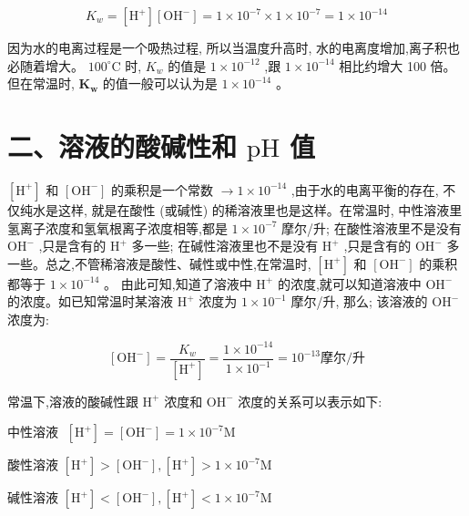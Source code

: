 \documentclass[10pt]{article}
\begin{document}
\[
{K}_{w} = \left\lbrack {\mathrm{H}}^{ + }\right\rbrack \left\lbrack {\mathrm{{OH}}}^{ - }\right\rbrack = 1 \times {10}^{-7} \times 1 \times {10}^{-7} = 1 \times {10}^{-{14}}
\]

因为水的电离过程是一个吸热过程, 所以当温度升高时, 水的电离度增加,离子积也必随着增大。 \({100}^{ \circ }\mathrm{C}\) 时, \({K}_{w}\) 的值是 \(1 \times {10}^{-{12}}\) ,跟 \(1 \times {10}^{-{14}}\) 相比约增大 100 倍。但在常温时, \({\mathbf{K}}_{\mathbf{w}}\) 的值一般可以认为是 \(1 \times {10}^{-{14}}\) 。

\section*{二、溶液的酸碱性和 \(\mathrm{{pH}}\) 值}

\(\left\lbrack {\mathrm{H}}^{ + }\right\rbrack\) 和 \(\left\lbrack {\mathrm{{OH}}}^{ - }\right\rbrack\) 的乘积是一个常数 \(\rightarrow 1 \times {10}^{-{14}}\) ,由于水的电离平衡的存在, 不仅纯水是这样, 就是在酸性 (或碱性) 的稀溶液里也是这样。在常温时, 中性溶液里氢离子浓度和氢氧根离子浓度相等,都是 \(1 \times {10}^{-7}\) 摩尔/升; 在酸性溶液里不是没有 \({\mathrm{{OH}}}^{ - }\) ,只是含有的 \({\mathrm{H}}^{ + }\) 多一些; 在碱性溶液里也不是没有 \({\mathrm{H}}^{ + }\) ,只是含有的 \({\mathrm{{OH}}}^{ - }\) 多一些。总之,不管稀溶液是酸性、碱性或中性,在常温时, \(\left\lbrack {\mathrm{H}}^{ + }\right\rbrack\) 和 \(\left\lbrack {\mathrm{{OH}}}^{ - }\right\rbrack\) 的乘积都等于 \(1 \times {10}^{-{14}}\) 。 由此可知,知道了溶液中 \({\mathrm{H}}^{ + }\) 的浓度,就可以知道溶液中 \({\mathrm{{OH}}}^{ - }\) 的浓度。如已知常温时某溶液 \({\mathrm{H}}^{ + }\) 浓度为 \(1 \times {10}^{-1}\) 摩尔/升, 那么; 该溶液的 \({\mathrm{{OH}}}^{ - }\) 浓度为:

\[
\left\lbrack {\mathrm{{OH}}}^{ - }\right\rbrack = \frac{{K}_{w}}{\left\lbrack {\mathrm{H}}^{ + }\right\rbrack } = \frac{1 \times {10}^{-{14}}}{1 \times {10}^{-1}} = {10}^{-{13}}\text{摩尔/升}
\]

常温下,溶液的酸碱性跟 \({\mathrm{H}}^{ + }\) 浓度和 \({\mathrm{{OH}}}^{ - }\) 浓度的关系可以表示如下:

中性溶液 \(\;\left\lbrack {\mathrm{H}}^{ + }\right\rbrack = \left\lbrack {\mathrm{{OH}}}^{ - }\right\rbrack = 1 \times {10}^{-7}\mathrm{M}\)

酸性溶液 \(\left\lbrack {\mathrm{H}}^{ + }\right\rbrack > \left\lbrack {\mathrm{{OH}}}^{ - }\right\rbrack ,\left\lbrack {\mathrm{H}}^{ + }\right\rbrack > 1 \times {10}^{-7}\mathrm{M}\)

碱性溶液 \(\left\lbrack {\mathrm{H}}^{ + }\right\rbrack < \left\lbrack {\mathrm{{OH}}}^{ - }\right\rbrack ,\left\lbrack {\mathrm{H}}^{ + }\right\rbrack < 1 \times {10}^{-7}\mathrm{M}\)
\end{document}
